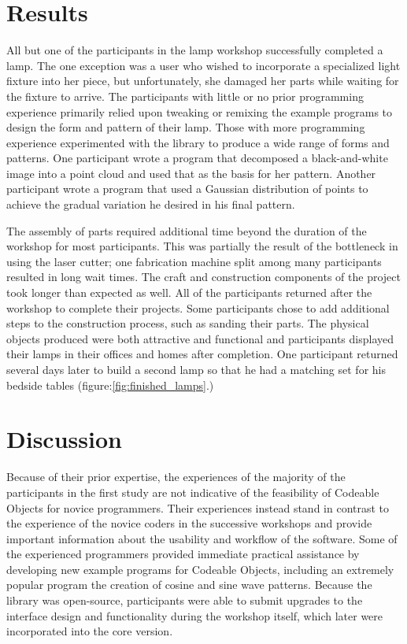 \section{Results}
All but one of the participants in the lamp workshop successfully completed a lamp. The one exception was a user who wished to incorporate a specialized light fixture into her piece, but unfortunately, she damaged her parts while waiting for the fixture to arrive. The participants with little or no prior programming experience primarily relied upon tweaking or remixing the example programs to design the form and pattern of their lamp. Those with more programming experience experimented with the library to produce a wide range of forms and patterns. One participant wrote a program that decomposed a black-and-white image into a point cloud and used that as the basis for her pattern. Another participant wrote a program that used a Gaussian distribution of points to achieve the gradual variation he desired in his final pattern. 

 The assembly of parts required additional time beyond the duration of the workshop for most participants. This was partially the result of the bottleneck in using the laser cutter; one fabrication machine split among many participants resulted in long wait times. The craft and construction components of the project took longer than expected as well. All of the participants returned after the workshop to complete their projects. Some participants chose to add additional steps to the construction process, such as sanding their parts. The physical objects produced were both attractive and functional and participants displayed their lamps in their offices and homes after completion. One participant returned several days later to build a second lamp so that he had a matching set for his bedside tables (figure:\ref{fig:finished_lamps}.)		
		
		
\section{Discussion}

Because of their prior expertise, the experiences of the majority of the participants in the first study are not indicative of the feasibility of Codeable Objects for novice programmers. Their experiences instead stand in contrast to the experience of the novice coders in the successive workshops and provide important information about the usability and workflow of the software. Some of the experienced programmers provided immediate practical assistance by developing new example programs for Codeable Objects, including an extremely popular program the creation of cosine and sine wave patterns. Because the library was open-source, participants were able to submit upgrades to the interface design and functionality during the workshop itself, which later were incorporated into the core version.

